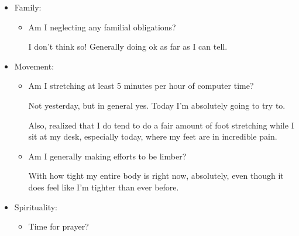 \documentclass[12pt]{article}
\renewcommand{\,}{\textsuperscript{,}}
\begin{document}
\begin{enumerate}
\begin{itemize}
\begin{itemize}
\item Did I eat a second meal?

On Friday, Saturday, and Sunday, yes!

\item Did I eat dinner?

I slept through dinner last night, other wise yesish.

\item Water?

Nowhere near enough, but much more than normal.\footnote{as it turns out, when walking all day, one needs to consume more, not less, liquid}

\end{itemize}

\item Family:

\begin{itemize}

\item Am I neglecting any familial obligations?

I don't think so!  
Generally doing ok as far as I can tell.

\end{itemize}

\item Movement:

\begin{itemize}

\item Am I stretching at least 5 minutes per hour of computer time?

Not yesterday, but in general yes.  
Today I'm absolutely going to try to.

Also, realized that I do tend to do a fair amount of foot stretching while I sit at my desk, especially today, where my feet are in incredible pain.

\item Am I generally making efforts to be limber?

With how tight my entire body is right now, absolutely, even though it does feel like I'm tighter than ever before.

\end{itemize}

\item Spirituality:

\begin{itemize}

\item Time for prayer?


\end{itemize}
\end{itemize}
\end{enumerate}
\end{document}
